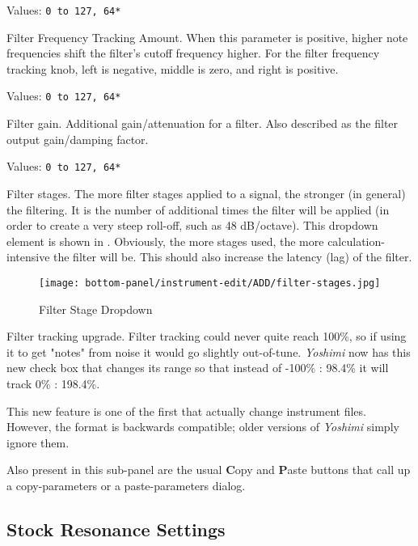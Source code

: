   Values: \texttt{0 to 127, 64*}

   Filter Frequency Tracking Amount.
   When this parameter is positive, higher note
   frequencies shift the filter’s cutoff frequency higher.
   For the filter frequency tracking knob, left is negative, middle is
   zero, and right is positive.

   Values: \texttt{0 to 127, 64*}

   Filter gain.
   Additional gain/attenuation for a filter.
   Also described as the filter output gain/damping factor.

   Values: \texttt{0 to 127, 64*}

   Filter stages.
   The more filter stages applied to a signal, the stronger (in general) the
   filtering.
   It is the number of additional times the filter will be applied (in
   order to create a very steep roll-off, such as 48 dB/octave).
   This dropdown
   element is shown in
   .
   Obviously, the more stages used, the more calculation-intensive the
   filter will be.  This should also increase the latency (lag) of the
   filter.

\begin{figure}[H]
   \centering
   \texttt{[image: bottom-panel/instrument-edit/ADD/filter-stages.jpg]}
   \caption[Filter Stage Dropdown]{Filter Stage Dropdown}
   \label{fig:filter_stage_dropdown}
\end{figure}

   Filter tracking upgrade.
   Filter tracking could never quite reach 100\%,
   so if using it to get "notes" from noise it would go slightly out-of-tune.
   \textsl{Yoshimi} now has this new check box that changes its range so that
   instead of -100\% : 98.4\% it will track 0\% : 198.4\%.

   This new feature is one of the first that actually change instrument files.
   However, the format is backwards compatible; older versions of
   \textsl{Yoshimi} simply ignore them.

   Also present in this sub-panel are the usual \textbf{C}opy
   and \textbf{P}aste buttons that call up a copy-parameters or
   a paste-parameters dialog.

\subsection{Stock Resonance Settings}
\label{subsec:stock_resonance_settings}

